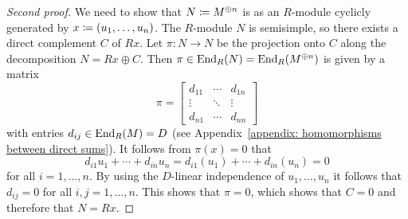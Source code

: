 \begin{proof}[Second proof]
  We need to show that $N \coloneqq M^{\oplus n}$ is as an $R$-module cyclicly generated by $x \coloneqq (u_1, \dotsc, u_n)$.
  The $R$-module $N$ is semisimple, so there exists a direct complement $C$ of $Rx$.
  Let $\pi \colon N \to N$ be the projection onto $C$ along the decomposition $N = Rx \oplus C$.
  Then $\pi \in \operatorname{End}_R(N) = \operatorname{End}_R(M^{\oplus n})$ is given by a matrix
  \[
      \pi
    = \begin{bmatrix}
        d_{11}  & \cdots  & d_{1n}  \\
        \vdots  & \ddots  & \vdots  \\
        d_{n1}  & \cdots  & d_{nn}
      \end{bmatrix}
  \]
  with entries $d_{ij} \in \operatorname{End}_R(M) = D$ (see Appendix~\ref{appendix: homomorphisms between direct sums}).
  It follows from $\pi(x) = 0$ that
  \[
      d_{i1} u_1 + \dotsb + d_{in} u_n
    = d_{i1}(u_1) + \dotsb + d_{in}(u_n)
    = 0
  \]
  for all $i = 1, \dotsc, n$.
  By using the $D$-linear independence of $u_1, \dotsc, u_n$ it follows that $d_{ij} = 0$ for all $i, j = 1, \dotsc, n$.
  This shows that $\pi = 0$, which shows that $C = 0$ and therefore that $N = Rx$.
\end{proof}





